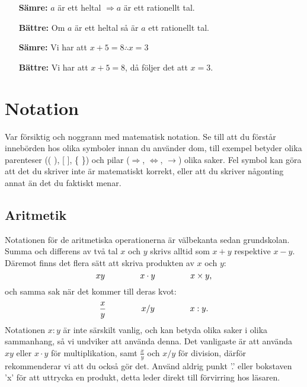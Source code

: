 \documentclass[titlepage]{article}
\begin{document}
\begin{itemize}
        \begin{itemize}[leftmargin=20mm]
            \item[\textbf{Sämre:}] $a$ är ett heltal $\Rightarrow a$ är ett rationellt tal.
            \item[\textbf{Bättre:}] Om $a$ är ett heltal så är $a$ ett rationellt tal.
            \vspace{2mm}
            \item[\textbf{Sämre:}] Vi har att $x+5=8 \therefore x = 3$
            \item[\textbf{Bättre:}]  Vi har att $x+5=8$, då följer det att $x = 3$.
        \end{itemize}
\end{itemize}




\section{Notation}\label{ch3}

Var försiktig och noggrann med matematisk notation. Se till att du förstår innebörden hos olika symboler innan du använder dom, till exempel betyder olika parenteser (( ), [ ], \{ \}) och pilar ($\Rightarrow$, $\Leftrightarrow$, $\to$) olika saker. Fel symbol kan göra att det du skriver inte är matematiskt korrekt, eller att du skriver någonting annat än det du faktiskt menar.




\subsection{Aritmetik}

Notationen för de aritmetiska operationerna är välbekanta sedan grundskolan. Summa och differens av två tal $x$ och $y$ skrivs alltid som $x+y$ respektive $x-y$. Däremot finns det flera sätt att skriva produkten av $x$ och $y$:
$$xy \hspace{15mm} x\cdot y \hspace{15mm} x \times y,$$
och samma sak när det kommer till deras kvot:
$$\frac{x}{y} \hspace{15mm} x/y \hspace{15mm}  x : y.$$
Notationen $x:y$ är inte särskilt vanlig, och kan betyda olika saker i olika sammanhang, så vi undviker att använda denna. Det vanligaste är att använda $xy$ eller $x \cdot y$ för multiplikation, samt $\frac{x}{y}$ och $x/y$ för division, därför rekommenderar vi att du också gör det. Använd aldrig punkt '.' eller bokstaven 'x' för att uttrycka en produkt, detta leder direkt till förvirring hos läsaren.
\end{document}
